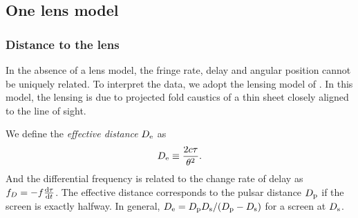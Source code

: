 \documentclass[useAMS,usenatbib]{mn2e}
\begin{document}
\subsection{One lens model}
\subsubsection{Distance to the lens}
In the absence of a lens model, the
fringe rate, delay and angular position cannot be uniquely related. To interpret the data, we adopt the lensing model of
\citep{2014MNRAS.442.3338P}.  In this model, the lensing is due to projected fold caustics of a thin sheet closely aligned to the line of sight. 




We define the {\it effective distance} $D_{\rm e}$ as
\begin{equation}
D_{\rm e} \equiv \frac{2c\tau}{\theta^2}.
\end{equation}
And the differential frequency is related to the change rate of delay
as $f_D  =-f\frac{\rm d\tau}{\operatorname{d \!} t}$.  The effective distance
corresponds to the pulsar distance $D_{\rm p}$ if the screen is exactly halfway.
In general, $D_{\rm e}={D_{\rm p} D_{\rm s}}/({D_{\rm p} - D_{\rm
    s}})$ for a screen at $D_{\rm s}$.


\end{document}
